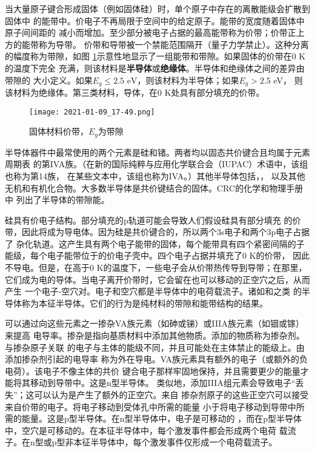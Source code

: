 当大量原子键合形成固体（例如固体硅）时，单个原子中存在的离散能级会扩散到固体中
的能带中。价电子不再局限于空间中的给定原子。能带的宽度随着固体中原子间间距的
减小而增加。至少部分被电子占据的最高能带称为价带；价带正上方的能带称为导带。
价带和导带被一个禁能范围隔开（量子力学禁止）。这种分离的幅度称为带隙，如图
\ref{fig:5.20}示意性地显示了一组能带和带隙。如果固体的价带在0 K的温度下完全
充满，则该材料是{\bf 半导体}或{\bf 绝缘体}。半导体和绝缘体之间的差异由带隙的
大小定义。如果$E_g \leq 2.5 \text{ eV}$，则该材料为半导体；如果$E_g >2.5$ eV，
则该材料为绝缘体。第三类材料，导体，在0 K处具有部分填充的价带。
\begin{figure}[htpb]
    \centering
    \texttt{[image: 2021-01-09\_17-49.png]}
    \caption{固体材料价带，$E_g$为带隙}
    \label{fig:5.20}
\end{figure}

半导体器件中最常使用的两个元素是硅和锗。两者均以固态共价键合且均属于元素周期表
的第IVA族。（在新的国际纯粹与应用化学联合会（IUPAC）术语中，该组也称为第14族，
在某些文本中，该组也称为IVA。）其他半导体包括，，
以及其他无机和有机化合物。大多数半导体是共价键结合的固体。CRC的化学和物理手册中
列出了半导体的带隙能。

硅具有价电子结构。部分填充的p轨道可能会导致人们假设硅具有部分填充
的价带，因此将成为导电体。因为硅是共价键合的，所以两个3s电子和两个3p电子占据了
杂化轨道。这产生具有两个电子能带的固体，每个能带具有四个紧密间隔的子
能级，每个电子能带位于的价电子壳中。四个电子占据并填充了0 K的价带，
因此不导电。但是，在高于0 K的温度下，一些电子会从价带热传导到导带；在那里，
它们成为电的导体。当电子离开价带时，它会留在也可以移动的正空穴之后，从而产生
一个电子-空穴对。电子和空穴都是半导体中的电荷载流子。诸如和之类
的半导体称为本征半导体。它们的行为是纯材料的带隙和能带结构的结果。

可以通过向这些元素之一掺杂VA族元素（如砷或锑）或IIIA族元素（如铟或镓）来提高
电导率。掺杂是指向基质材料中添加其他物质。添加的物质称为掺杂剂。与掺杂原子关联
的电子与主体的能级不同，并且可能处在主体禁止的能级上。由添加掺杂剂引起的电导率
称为外在导电。VA族元素具有额外的电子（或额外的负电荷）。该电子不像主体的共价
键合电子那样牢固地保持，并且需要更少的能量才能将其移动到导带中。这是n型半导体。
类似地，添加IIIA组元素会导致电子“丢失”；这可以认为是产生了额外的正空穴。来自
掺杂剂原子的这些正空穴可以接受来自价带的电子。将电子移动到受体孔中所需的能量
小于将电子移动到导带中所需的能量。这是p型半导体。在n型半导体中，电子是可移动的
，而在p型半导体中，空穴是可移动的。在本征半导体中，每个激发事件都会形成两个电荷
载流子。在n型或p型非本征半导体中，每个激发事件仅形成一个电荷载流子。

